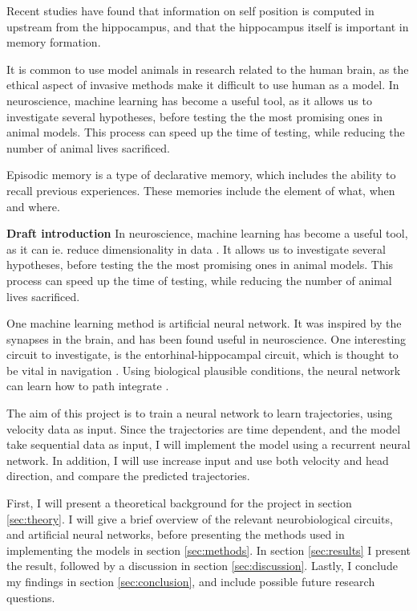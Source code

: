 Recent studies have found that information on self position is computed in upstream from the hippocampus, and that the hippocampus itself is important in memory formation.

It is common to use model animals in research related to the human brain, as the ethical aspect of invasive methods make it difficult to use human as a model. In neuroscience, machine learning has become a useful tool, as it allows us to investigate several hypotheses, before testing the the most promising ones in animal models. This process can speed up the time of testing, while reducing the number of animal lives sacrificed.

Episodic memory is a type of declarative memory, which includes the ability to recall previous experiences. These memories include the element of what, when and where.

\textbf{Draft introduction}
In neuroscience, machine learning has become a useful tool, as it can ie. reduce dimensionality in data \cite{Badrulhisham:2024:ml_and_ai_in_neuroscience}. It allows us to investigate several hypotheses, before testing the the most promising ones in animal models. This process can speed up the time of testing, while reducing the number of animal lives sacrificed. 

One machine learning method is artificial neural network. It was inspired by the synapses in the brain, and has been found useful in neuroscience. 
One interesting circuit to investigate, is the entorhinal-hippocampal circuit, which is thought to be vital in navigation \cite{okeefe:1978:hippocampus, hafting:2005:microstructure}. Using biological plausible conditions, the neural network can learn how to path integrate \cite{banino:2018:vector_based}.

The aim of this project is to train a neural network to learn trajectories, using velocity data as input. Since the trajectories are time dependent, and the model take sequential data as input, I will implement the model using a recurrent neural network. In addition, I will use increase input and use both velocity and head direction, and compare the predicted trajectories.

First, I will present a theoretical background for the project in section \ref{sec:theory}. I will give a brief overview of the relevant neurobiological circuits, and artificial neural networks, before presenting the methods used in implementing the models in section \ref{sec:methods}. In section \ref{sec:results} I present the result, followed by a discussion in section \ref{sec:discussion}. Lastly, I conclude my findings in section \ref{sec:conclusion}, and include possible future research questions.


